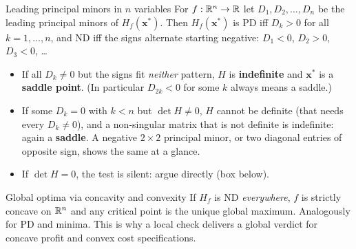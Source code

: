\begin{rulebox}{Leading principal minors in $n$ variables}
For $f : \mathbb{R}^n \to \mathbb{R}$ let $D_1, D_2, \dots, D_n$ be the leading principal
minors of $H_f(\mathbf{x}^*)$. Then $H_f(\mathbf{x}^*)$ is PD iff
$D_k > 0$ for all $k = 1, \dots, n$, and ND iff the signs alternate
starting negative: $D_1 < 0$, $D_2 > 0$, $D_3 < 0$, \dots
\begin{itemize}[leftmargin=1.6em,itemsep=0.3ex]
  \item If all $D_k\neq0$ but the signs fit \emph{neither} pattern, $H$ is
        \textbf{indefinite} and $\mathbf{x}^*$ is a \textbf{saddle point}.
        (In particular $D_{2k}<0$ for some $k$ always means a saddle.)
  \item If some $D_k=0$ with $k<n$ but $\det H\neq0$, $H$ cannot be
        definite (that needs every $D_k\neq0$), and a non-singular matrix
        that is not definite is indefinite: again a \textbf{saddle}. A
        negative $2\times2$ principal minor, or two diagonal entries of
        opposite sign, shows the same at a glance.
  \item If $\det H=0$, the test is silent: argue directly (box below).
\end{itemize}
\end{rulebox}

\begin{rulebox}{Global optima via concavity and convexity}
If $H_f$ is ND \emph{everywhere}, $f$ is strictly concave on $\mathbb{R}^n$ and any
critical point is the unique global maximum. Analogously for PD and minima.
This is why a local check delivers a global verdict for concave profit and
convex cost specifications.
\end{rulebox}

